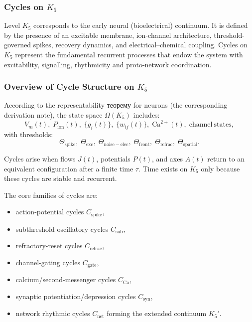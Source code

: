 
\subsubsection{Cycles on \texorpdfstring{$K_5$}{K_5}}
\label{sec:cycles-k5}

Level $K_5$ corresponds to the early neural (bioelectrical) continuum.
It is defined by the presence of an excitable membrane, ion-channel
architecture, threshold-governed spikes, recovery dynamics, and
electrical–chemical coupling.
Cycles on $K_5$ represent the fundamental recurrent processes that endow
the system with excitability, signalling, rhythmicity and proto-network
coordination.

\subsubsection{Overview of Cycle Structure on \texorpdfstring{$K_5$}{K_5}}

According to the representability теорему for neurons (the corresponding derivation note),
the state space $\Omega(K_5)$ includes:
\[
  V_m(t),\;
  P_{\mathrm{ion}}(t),\;
  \{g_i(t)\},\;
  \{w_{ij}(t)\},\;
  \mathrm{Ca}^{2+}(t),\;
  \mathrm{channel\ states},
\]
with thresholds:
\[
  \Theta_{\mathrm{spike}},\;
  \Theta_{\mathrm{exc}},\;
  \Theta_{\mathrm{noise-elec}},\;
  \Theta_{\mathrm{front}},\;
  \Theta_{\mathrm{refrac}},\;
  \Theta_{\mathrm{spatial}}.
\]

Cycles arise when flows $J(t)$, potentials $P(t)$, and axes $A(t)$
return to an equivalent configuration after a finite time $\tau$.
Time exists on $K_5$ only because these cycles are stable and recurrent.

The core families of cycles are:

\begin{itemize}
  \item action-potential cycles $C_{\mathrm{spike}}$,
  \item subthreshold oscillatory cycles $C_{\mathrm{sub}}$,
  \item refractory-reset cycles $C_{\mathrm{refrac}}$,
  \item channel-gating cycles $C_{\mathrm{gate}}$,
  \item calcium/second-messenger cycles $C_{\mathrm{Ca}}$,
  \item synaptic potentiation/depression cycles $C_{\mathrm{syn}}$,
  \item network rhythmic cycles $C_{\mathrm{net}}$ forming the extended continuum $K_5'$.
\end{itemize}

